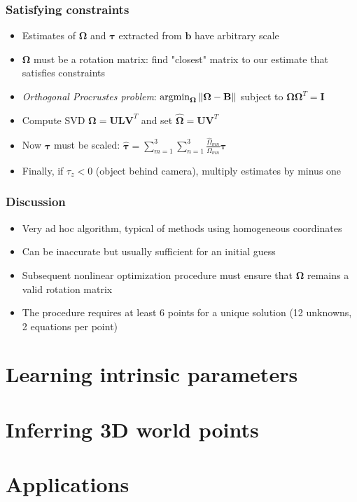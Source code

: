 \documentclass{beamer}
\begin{document}
\begin{frame}
  \frametitle{Satisfying constraints}
  \begin{itemize}[<+->]
    \item Estimates of $\boldsymbol{\Omega}$ and $\bm{\tau}$ extracted from
      $\mathbf{b}$ have arbitrary scale
    \item $\boldsymbol{\Omega}$ must be a rotation matrix: find "closest" matrix
      to our estimate that satisfies constraints
    \item \emph{Orthogonal Procrustes problem}:
      $\operatorname{argmin}_{\boldsymbol{\Omega}}
      \left\lVert\boldsymbol{\Omega}-\mathbf{B}\right\rVert$ subject to
      $\boldsymbol{\Omega\Omega}^T = \mathbf{I}$
    \item Compute SVD $\boldsymbol{\Omega} = \mathbf{ULV}^T$ and set
      $\boldsymbol{\hat{\Omega}} = \mathbf{UV}^T$
    \item Now $\bm{\tau}$ must be scaled:
      $\bm{\hat{\tau}} = \sum_{m=1}^3 \sum_{n=1}^3 \frac{\hat{\Omega}_{mn}}
      {\Omega_{mn}}\bm{\tau}$
    \item Finally, if $\tau_z < 0$ (object behind camera),
      multiply estimates by minus one
  \end{itemize}
\end{frame}

\begin{frame}
  \frametitle{Discussion}
  \begin{itemize}
    \item Very ad hoc algorithm, typical of methods using homogeneous
      coordinates
    \item Can be inaccurate but usually sufficient for an initial guess
    \item Subsequent nonlinear optimization procedure must ensure that
      $\boldsymbol{\Omega}$ remains a valid rotation matrix
    \item The procedure requires at least 6 points for a unique solution (12
      unknowns, 2 equations per point)
  \end{itemize}
\end{frame}

\section{Learning intrinsic parameters}
\section{Inferring 3D world points}
\section{Applications}
\end{document}
